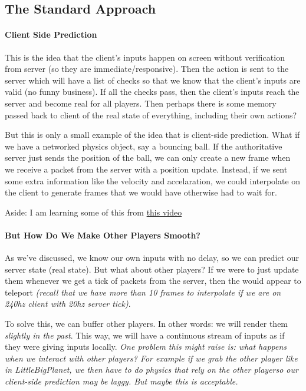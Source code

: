 \documentclass{article}
\begin{document}
\subsection*{The Standard
Approach}
\paragraph*{Client Side Prediction}
This is the idea that the client's inputs happen on screen without
verification from server (so they are immediate/responsive). Then the
action is sent to the server which will have a list of checks so that
we know that the client's inputs are valid (no funny business). If
all the checks pass, then the client's inputs reach the server and
become real for all players. Then perhaps there is some memory passed
back to client of the real state of everything, including their own actions?

\par But this is only a small example of the idea that is client-side
prediction. What if we have a networked physics object, say a
bouncing ball. If the authoritative server just sends the position of
the ball, we can only create a new frame when we receive a packet
from the server with a position update. Instead, if we sent some
extra information like the velocity and accelaration, we could
interpolate on the client to generate frames that we would have
otherwise had to wait for.

\par Aside: I am learning some of this from
\href{https://www.youtube.com/watch?v=KBBJqPL5-eU&t=788s}{this video}

\paragraph*{But How Do We Make Other Players Smooth?}
As we've discussed, we know our own inputs with no delay, so we can
predict our server state (real state). But what about other players?
If we were to just update them whenever we get a tick of packets from
the server, then the would appear to teleport \textit{(recall that we have
  more than 10 frames to interpolate if we are on 240hz client with
20hz server tick)}.

\par To solve this, we can buffer other players. In other words: we
will render them \textit{slightly in the past}. This way, we will
have a continuous stream of inputs as if they were giving inputs
locally. \textit{One problem this might raise is: what happens when
we interact with other players? For example if we grab the other
player like in LittleBigPlanet, we then have to do physics that rely
on the other player\textemdash so our client-side prediction may be
laggy. But maybe this is acceptable.}
\end{document}
